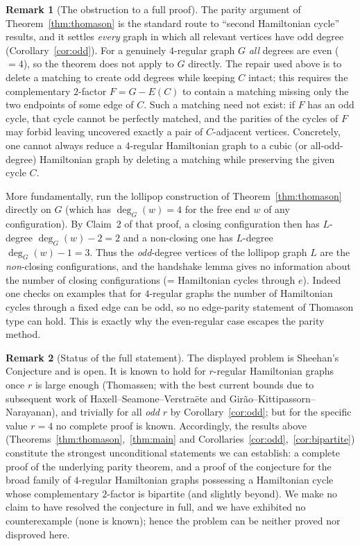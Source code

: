 \documentclass{amsart}
\theoremstyle{plain}
\theoremstyle{definition}
\newtheorem{remark}{Remark}
\begin{document}
\begin{remark}[The obstruction to a full proof]\label{rem:obstruction}
The parity argument of Theorem~\ref{thm:thomason} is the standard route to
``second Hamiltonian cycle'' results, and it settles \emph{every} graph in which
all relevant vertices have odd degree (Corollary~\ref{cor:odd}).  For a genuinely
$4$-regular graph $G$ \emph{all} degrees are even ($=4$), so the theorem does not
apply to $G$ directly.  The repair used above is to delete a matching to create
odd degrees while keeping $C$ intact; this requires the complementary
$2$-factor $F=G-E(C)$ to contain a matching missing only the two endpoints of
some edge of $C$.  Such a matching need not exist: if $F$ has an odd cycle, that
cycle cannot be perfectly matched, and the parities of the cycles of $F$ may
forbid leaving uncovered exactly a pair of $C$-adjacent vertices.  Concretely,
one cannot always reduce a $4$-regular Hamiltonian graph to a cubic (or
all-odd-degree) Hamiltonian graph by deleting a matching while preserving the
given cycle $C$.

More fundamentally, run the lollipop construction of
Theorem~\ref{thm:thomason} directly on $G$ (which has $\deg_G(w)=4$ for the free
end $w$ of any configuration).  By Claim~2 of that proof, a closing
configuration then has $L$-degree $\deg_G(w)-2=2$ and a non-closing one has
$L$-degree $\deg_G(w)-1=3$.  Thus the \emph{odd}-degree vertices of the lollipop
graph $L$ are the \emph{non}-closing configurations, and the handshake lemma
gives no information about the number of closing configurations (= Hamiltonian
cycles through $e$).  Indeed one checks on examples that for $4$-regular graphs
the number of Hamiltonian cycles through a fixed edge can be odd, so no
edge-parity statement of Thomason type can hold.  This is exactly why the
even-regular case escapes the parity method.
\end{remark}

\begin{remark}[Status of the full statement]
The displayed problem is Sheehan's Conjecture and is open.  It is known to hold
for $r$-regular Hamiltonian graphs once $r$ is large enough (Thomassen; with the
best current bounds due to subsequent work of Haxell--Seamone--Verstra\"ete and
Girão--Kittipassorn--Narayanan), and trivially for all \emph{odd} $r$ by
Corollary~\ref{cor:odd}; but for the specific value $r=4$ no complete proof is
known.  Accordingly, the results above
(Theorems~\ref{thm:thomason},~\ref{thm:main} and
Corollaries~\ref{cor:odd},~\ref{cor:bipartite}) constitute the strongest
unconditional statements we can establish: a complete proof of the underlying
parity theorem, and a proof of the conjecture for the broad family of
$4$-regular Hamiltonian graphs possessing a Hamiltonian cycle whose
complementary $2$-factor is bipartite (and slightly beyond).  We make no claim
to have resolved the conjecture in full, and we have exhibited no counterexample
(none is known); hence the problem can be neither proved nor disproved here.
\end{remark}
\end{document}
